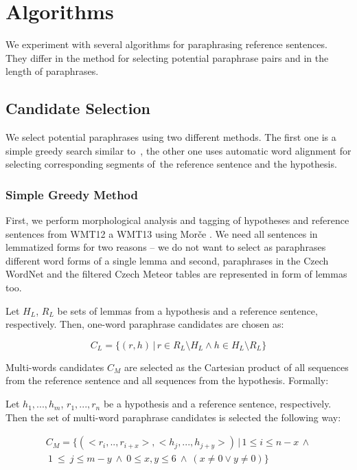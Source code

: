 \section{Algorithms}
\label{algorithm}
We experiment with several algorithms for paraphrasing reference sentences. 
They differ in the method for selecting potential paraphrase pairs and in the 
length of paraphrases.

\subsection{Candidate Selection}
We select potential paraphrases using two different methods. The first one is a 
simple greedy search similar to~\citet{kauchak}, the other one uses automatic word
alignment for selecting corresponding segments of~the reference sentence and the 
hypothesis.

\subsubsection{Simple Greedy Method}
First, we perform morphological analysis and tagging of hypotheses and 
reference sentences from WMT12 a WMT13 using Morče \citep{morce:2007}. 
We need all sentences in lemmatized forms for two reasons -- we do not want 
to select as paraphrases different word forms of a single lemma and second, 
paraphrases in the Czech WordNet and the filtered Czech Meteor tables are 
represented in form of lemmas too.

Let $ H_{L} $, $ R_{L} $ be sets of lemmas from a hypothesis and a reference 
sentence, respectively. Then, one-word paraphrase candidates are chosen as:

\begin{equation*}
C_{L} = \{(r,h) \, | \, r \in R_{L} \setminus H_{L} \wedge h \in H_{L} \setminus R_{L} \} 
\end{equation*}

Multi-words candidates $ C_M $ are selected as the Cartesian product of all sequences
from the reference sentence and all sequences from the hypothesis.  Formally:

Let $ h_1,...,h_m $, $ r_1,..., r_n $  be a hypothesis and a reference sentence,
respectively. Then the set of multi-word paraphrase candidates is selected the following
way:

\begin{align*}
  C_{M} = \{ (<r_i,..,r_{i+x}>,<h_j,...,h_{j+y}>) \, | \, 1 \leq i \leq n-x \, \wedge \\ 
    \: 1~\leq~j \leq m-y  \: \wedge \: 0 \leq x,y \leq 6 \: \wedge \: (x \neq 0 \vee y \neq 0) \}
  \end{align*}
  
